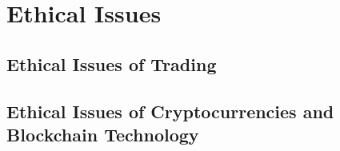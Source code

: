 \chapter{Ethical Issues}

\section{Ethical Issues of Trading}

\section{Ethical Issues of Cryptocurrencies and Blockchain Technology}
